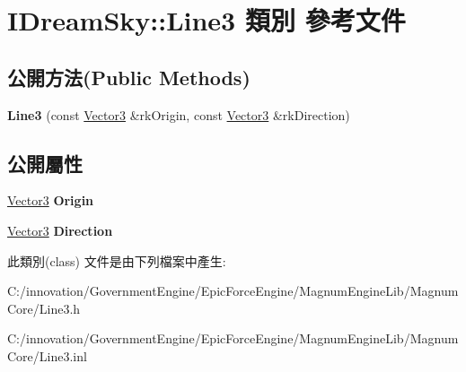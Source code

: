 \hypertarget{class_i_dream_sky_1_1_line3}{}\section{I\+Dream\+Sky\+:\+:Line3 類別 參考文件}
\label{class_i_dream_sky_1_1_line3}
\subsection*{公開方法(Public Methods)}
\begin{DoxyCompactItemize}
\item 
{\bfseries Line3} (const \hyperlink{class_i_dream_sky_1_1_vector3}{Vector3} \&rk\+Origin, const \hyperlink{class_i_dream_sky_1_1_vector3}{Vector3} \&rk\+Direction)\hypertarget{class_i_dream_sky_1_1_line3_aa23f3e8213c9f504c6d3053d93cd968c}{}\label{class_i_dream_sky_1_1_line3_aa23f3e8213c9f504c6d3053d93cd968c}

\end{DoxyCompactItemize}
\subsection*{公開屬性}
\begin{DoxyCompactItemize}
\item 
\hyperlink{class_i_dream_sky_1_1_vector3}{Vector3} {\bfseries Origin}\hypertarget{class_i_dream_sky_1_1_line3_a5c09737d24366d4ae23c52c3ad10d805}{}\label{class_i_dream_sky_1_1_line3_a5c09737d24366d4ae23c52c3ad10d805}

\item 
\hyperlink{class_i_dream_sky_1_1_vector3}{Vector3} {\bfseries Direction}\hypertarget{class_i_dream_sky_1_1_line3_a9524d0ef6f06cb611d52ad67c7e905d7}{}\label{class_i_dream_sky_1_1_line3_a9524d0ef6f06cb611d52ad67c7e905d7}

\end{DoxyCompactItemize}


此類別(class) 文件是由下列檔案中產生\+:\begin{DoxyCompactItemize}
\item 
C\+:/innovation/\+Government\+Engine/\+Epic\+Force\+Engine/\+Magnum\+Engine\+Lib/\+Magnum\+Core/Line3.\+h\item 
C\+:/innovation/\+Government\+Engine/\+Epic\+Force\+Engine/\+Magnum\+Engine\+Lib/\+Magnum\+Core/Line3.\+inl\end{DoxyCompactItemize}
